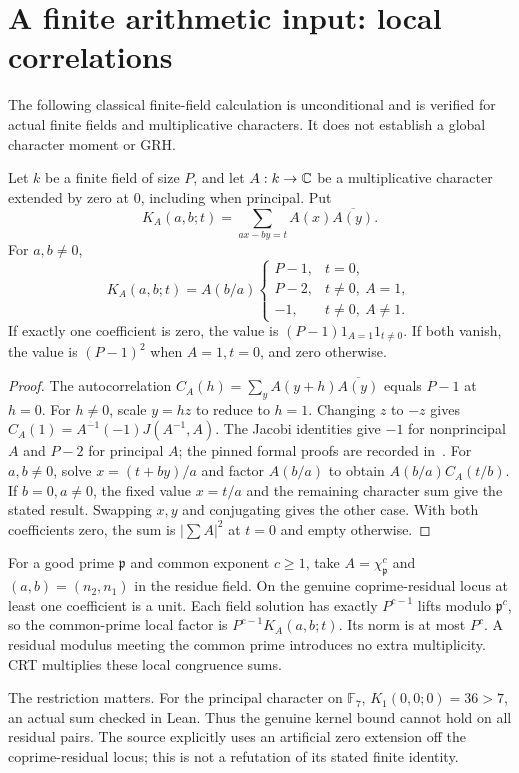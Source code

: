 \section{A finite arithmetic input: local correlations}
The following classical finite-field calculation is unconditional and
is verified for actual finite fields and multiplicative characters.
It does not establish a global character moment or GRH.
\begin{theorem}\label{thm:finite-kernel}
Let $k$ be a finite field of size $P$, and let $A:k\to\mathbb C$ be a
multiplicative character extended by zero at $0$, including when principal.
Put
\[
 K_A(a,b;t)=\sum_{ax-by=t}A(x)\overline{A(y)}.
\]
For $a,b\ne0$,
\[
 K_A(a,b;t)=A(b/a)
 \begin{cases}
 P-1,&t=0,\\
 P-2,&t\ne0,\ A=1,\\
 -1,&t\ne0,\ A\ne1.
 \end{cases}
\]
If exactly one coefficient is zero, the value is
$(P-1)1_{A=1}1_{t\ne0}$. If both vanish, the value is
$(P-1)^2$ when $A=1,t=0$, and zero otherwise.
\end{theorem}
\begin{proof}
The autocorrelation $C_A(h)=\sum_yA(y+h)\overline{A(y)}$ equals
$P-1$ at $h=0$. For $h\ne0$, scale $y=hz$ to reduce to $h=1$.
Changing $z$ to $-z$ gives
$C_A(1)=A^{-1}(-1)J(A^{-1},A)$.
The Jacobi identities give $-1$ for nonprincipal $A$ and $P-2$ for
principal $A$; the pinned formal proofs are recorded in~\cite{mathlibfinite}.
For $a,b\ne0$, solve $x=(t+by)/a$ and factor $A(b/a)$ to obtain
$A(b/a)C_A(t/b)$. If $b=0,a\ne0$, the fixed value $x=t/a$ and
the remaining character sum give the stated result. Swapping $x,y$
and conjugating gives the other case. With both coefficients zero,
the sum is $|\sum A|^2$ at $t=0$ and empty otherwise.
\end{proof}

For a good prime $\mathfrak p$ and common exponent $c\ge1$, take
$A=\chi_{\mathfrak p}^c$ and $(a,b)=(n_2,n_1)$ in the residue field.
On the genuine coprime-residual locus at least one coefficient is a unit.
Each field solution has exactly $P^{c-1}$ lifts modulo $\mathfrak p^c$,
so the common-prime local factor is $P^{c-1}K_A(a,b;t)$.
Its norm is at most $P^c$. A residual modulus meeting the common
prime introduces no extra multiplicity. CRT multiplies these local
congruence sums.

The restriction matters. For the principal character on $\mathbb F_7$,
$K_1(0,0;0)=36>7$, an actual sum checked in Lean. Thus the genuine
kernel bound cannot hold on all residual pairs. The source explicitly
uses an artificial zero extension off the coprime-residual locus; this
is not a refutation of its stated finite identity.

